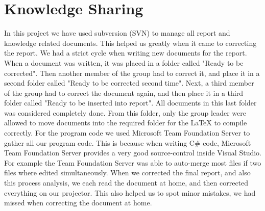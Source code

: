 \section{Knowledge Sharing}
In this project we have used subversion (SVN) to manage all report and knowledge related documents. This helped us greatly when it came to correcting the report. We had a strict cycle when writing new documents for the report. When a document was written, it was placed in a folder called "Ready to be corrected". Then another member of the group had to correct it, and place it in a second folder called "Ready to be corrected second time". Next, a third member of the group had to correct the document again, and then place it in a third folder called "Ready to be inserted into report". All documents in this last folder was considered completely done. From this folder, only the group leader were allowed to move documents into the required folder for the LaTeX to compile correctly. For the program code we used Microsoft Team Foundation Server to gather all our program code. This is because when writing C\# code, Microsoft Team Foundation Server provides a very good source-control inside Visual Studio. For example the Team Foundation Server was able to auto-merge most files if two files where edited simultaneously. When we corrected the final report, and also this process analysis, we each read the document at home, and then corrected everything on our projector. This also helped us to spot minor mistakes, we had missed when correcting the document at home.